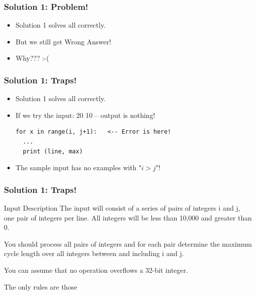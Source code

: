 \begin{frame}
  \frametitle{Solution 1: Problem!}

  \begin{itemize}
    \item Solution 1 solves all  correctly.
    \bigskip

    \item But we still get \alert{Wrong Answer!}
    \bigskip

    \item Why??? :-(
  \end{itemize}
\end{frame}

\begin{frame}[fragile]
  \frametitle{Solution 1: Traps!}

  \begin{itemize}
    \item Solution 1 solves all  correctly.
    \bigskip

    \item If we try the input: \alert{20 10} -- output is \alert{nothing!}
\begin{verbatim}
for x in range(i, j+1):   <-- Error is here!
  ...
  print (line, max)
\end{verbatim}
    \bigskip

    \item The sample input has \alert{no examples} with "\alert{$i > j$}"!
  \end{itemize}
\end{frame}

\begin{frame}
  \frametitle{Solution 1: Traps!}

    \begin{block}{Input Description}
    The input will consist of a series of \alert{pairs of integers} i and j, one pair of
    integers per line. All integers will be \alert{less than 10,000 and greater than 0.}

    \bigskip

    You should process all pairs of integers and for each pair determine the maximum
    cycle length over \alert{all integers between and including i and j}.

    \bigskip

    You can \alert{assume that no operation overflows a 32-bit integer}.
    \end{block}
    \bigskip

    The only rules are those 
\end{frame}

